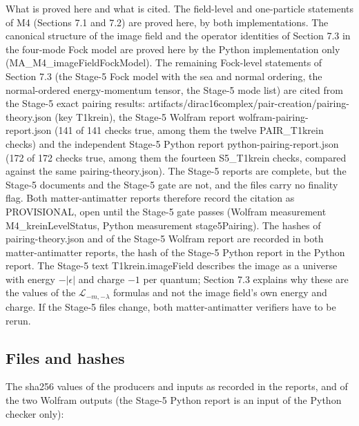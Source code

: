 \documentclass[11pt]{article}
\begin{document}
What is proved here and what is cited. The field-level and one-particle statements of M4 (Sections 7.1 and 7.2) are proved here, by both implementations. The canonical structure of the image field and the operator identities of Section 7.3 in the four-mode Fock model are proved here by the Python implementation only (MA\_M4\_imageFieldFockModel). The remaining Fock-level statements of Section 7.3 (the Stage-5 Fock model with the sea and normal ordering, the normal-ordered energy-momentum tensor, the Stage-5 mode list) are cited from the Stage-5 exact pairing results: artifacts/dirac16complex/pair-creation/pairing-theory.json (key T1krein), the Stage-5 Wolfram report wolfram-pairing-report.json (141 of 141 checks true, among them the twelve PAIR\_T1krein checks) and the independent Stage-5 Python report python-pairing-report.json (172 of 172 checks true, among them the fourteen S5\_T1krein checks, compared against the same pairing-theory.json). The Stage-5 reports are complete, but the Stage-5 documents and the Stage-5 gate are not, and the files carry no finality flag. Both matter-antimatter reports therefore record the citation as PROVISIONAL, open until the Stage-5 gate passes (Wolfram measurement M4\_kreinLevelStatus, Python measurement stage5Pairing). The hashes of pairing-theory.json and of the Stage-5 Wolfram report are recorded in both matter-antimatter reports, the hash of the Stage-5 Python report in the Python report. The Stage-5 text T1krein.imageField describes the image as a universe with energy $-|\epsilon|$ and charge $-1$ per quantum; Section 7.3 explains why these are the values of the $\mathcal L_{-m,-\lambda}$ formulas and not the image field's own energy and charge. If the Stage-5 files change, both matter-antimatter verifiers have to be rerun.

\subsection{Files and hashes}

The sha256 values of the producers and inputs as recorded in the reports, and of the two Wolfram outputs (the Stage-5 Python report is an input of the Python checker only):
\end{document}
